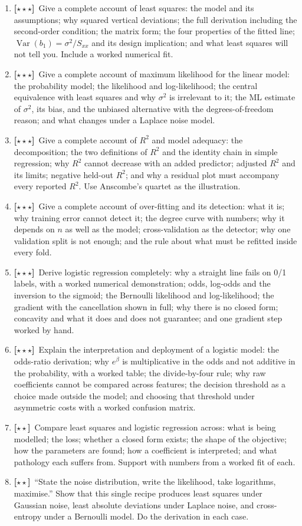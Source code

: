 \documentclass[11pt,a4paper]{article}
\newcommand{\LA}{{\footnotesize\textbf{[$\star\star\star$]}}}
\newcommand{\LB}{{\footnotesize\textbf{[$\star\star$]}}}
\newcommand{\Q}[1]{\item[\textbf{#1}]}
\begin{document}
\begin{enumerate}[leftmargin=2.2cm]
\Q{U5.68}\LA\ Give a complete account of least squares: the model and its
  assumptions; why squared vertical deviations; the full derivation including
  the second-order condition; the matrix form; the four properties of the
  fitted line; $\operatorname{Var}(b_1) = \sigma^2/S_{xx}$ and its design
  implication; and what least squares will not tell you. Include a worked
  numerical fit.
\Q{U5.69}\LA\ Give a complete account of maximum likelihood for the linear
  model: the probability model; the likelihood and log-likelihood; the central
  equivalence with least squares and why $\sigma^2$ is irrelevant to it; the ML
  estimate of $\sigma^2$, its bias, and the unbiased alternative with the
  degrees-of-freedom reason; and what changes under a Laplace noise model.
\Q{U5.70}\LA\ Give a complete account of $R^2$ and model adequacy: the
  decomposition; the two definitions of $R^2$ and the identity chain in simple
  regression; why $R^2$ cannot decrease with an added predictor; adjusted
  $R^2$ and its limits; negative held-out $R^2$; and why a residual plot must
  accompany every reported $R^2$. Use Anscombe's quartet as the illustration.
\Q{U5.71}\LA\ Give a complete account of over-fitting and its detection: what
  it is; why training error cannot detect it; the degree curve with numbers;
  why it depends on $n$ as well as the model; cross-validation as the
  detector; why one validation split is not enough; and the rule about what
  must be refitted inside every fold.
\Q{U5.72}\LA\ Derive logistic regression completely: why a straight line fails
  on 0/1 labels, with a worked numerical demonstration; odds, log-odds and the
  inversion to the sigmoid; the Bernoulli likelihood and log-likelihood; the
  gradient with the cancellation shown in full; why there is no closed form;
  concavity and what it does and does not guarantee; and one gradient step
  worked by hand.
\Q{U5.73}\LA\ Explain the interpretation and deployment of a logistic model:
  the odds-ratio derivation; why $e^\beta$ is multiplicative in the odds and
  not additive in the probability, with a worked table; the divide-by-four
  rule; why raw coefficients cannot be compared across features; the decision
  threshold as a choice made outside the model; and choosing that threshold
  under asymmetric costs with a worked confusion matrix.
\Q{U5.74}\LB\ Compare least squares and logistic regression across: what is
  being modelled; the loss; whether a closed form exists; the shape of the
  objective; how the parameters are found; how a coefficient is interpreted;
  and what pathology each suffers from. Support with numbers from a worked fit
  of each.
\Q{U5.75}\LB\ ``State the noise distribution, write the likelihood, take
  logarithms, maximise.'' Show that this single recipe produces least squares
  under Gaussian noise, least absolute deviations under Laplace noise, and
  cross-entropy under a Bernoulli model. Do the derivation in each case.
\end{enumerate}
\end{document}
